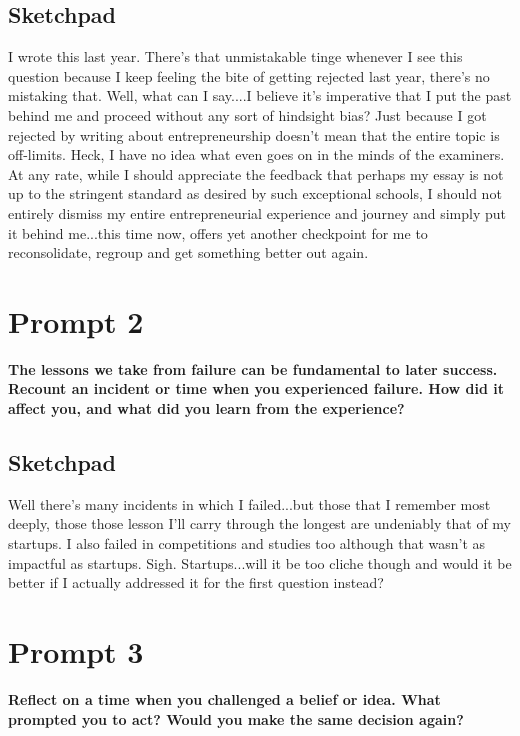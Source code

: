 \subsection{Sketchpad}
I wrote this last year. There's that unmistakable tinge whenever I see this question because I keep feeling the bite of getting rejected last year, there's no mistaking that. Well, what can I say....I believe it's imperative that I put the past behind me and proceed without any sort of hindsight bias? Just because I got rejected by writing about entrepreneurship doesn't mean that the entire topic is off-limits. Heck, I have no idea what even goes on in the minds of the examiners. At any rate, while I should appreciate the feedback that perhaps my essay is not up to the stringent standard as desired by such exceptional schools, I should not entirely dismiss my entire entrepreneurial experience and journey and simply put it behind me...this time now, offers yet another checkpoint for me to reconsolidate, regroup and get something better out again.

\section{Prompt 2}
\textbf{The lessons we take from failure can be fundamental to later success. Recount an incident or time when you experienced failure. How did it affect you, and what did you learn from the experience?}

\subsection{Sketchpad}
Well there's many incidents in which I failed...but those that I remember most deeply, those those lesson I'll carry through the longest are undeniably that of my startups. I also failed in competitions and studies too although that wasn't as impactful as startups. Sigh. Startups...will it be too cliche though and would it be better if I actually addressed it for the first question instead?

\section{Prompt 3}
\textbf{Reflect on a time when you challenged a belief or idea. What prompted you to act? Would you make the same decision again?}
